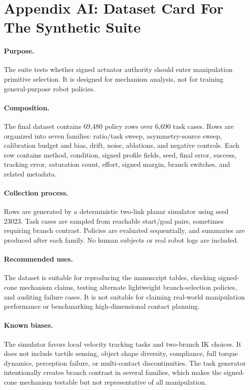 \documentclass{article}
\begin{document}
\section*{Appendix AI: Dataset Card For The Synthetic Suite}

\paragraph{Purpose.}
The suite tests whether signed actuator authority should enter manipulation primitive selection. It is designed for mechanism analysis, not for training general-purpose robot policies.

\paragraph{Composition.}
The final dataset contains 69,480 policy rows over 6,690 task cases. Rows are organized into seven families: ratio/task sweep, asymmetry-source sweep, calibration budget and bias, drift, noise, ablations, and negative controls. Each row contains method, condition, signed profile fields, seed, final error, success, tracking error, saturation count, effort, signed margin, branch switches, and related metadata.

\paragraph{Collection process.}
Rows are generated by a deterministic two-link planar simulator using seed 23023. Task cases are sampled from reachable start/goal pairs, sometimes requiring branch contrast. Policies are evaluated sequentially, and summaries are produced after each family. No human subjects or real robot logs are included.

\paragraph{Recommended uses.}
The dataset is suitable for reproducing the manuscript tables, checking signed-cone mechanism claims, testing alternate lightweight branch-selection policies, and auditing failure cases. It is not suitable for claiming real-world manipulation performance or benchmarking high-dimensional contact planning.

\paragraph{Known biases.}
The simulator favors local velocity tracking tasks and two-branch IK choices. It does not include tactile sensing, object shape diversity, compliance, full torque dynamics, perception failure, or multi-contact discontinuities. The task generator intentionally creates branch contrast in several families, which makes the signed-cone mechanism testable but not representative of all manipulation.
\end{document}
